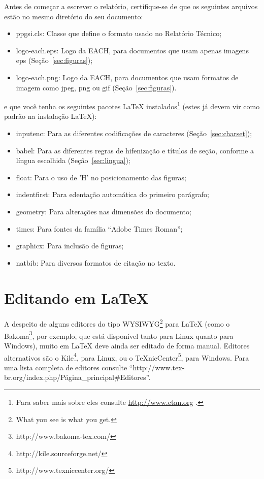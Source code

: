 \documentclass[12pt,a4paper,utf8]{ppgsi}
\begin{document}
	Antes de começar a escrever o relatório, certifique-se de que os seguintes arquivos estão no mesmo diretório do seu documento:

	\begin{itemize}
		\item ppgsi.cls: Classe \LaTeXe{} que define o formato usado no Relatório Técnico;
		\item logo-each.eps: Logo da EACH, para documentos que usam apenas imagens eps (Seção~\ref{sec:figuras});
		\item logo-each.png: Logo da EACH, para documentos que usam formatos de imagem como jpeg, png ou gif (Seção~\ref{sec:figuras}).
	\end{itemize}
	
	\noindent e que você tenha os seguintes pacotes \LaTeX{} instalados\footnote{Para saber mais sobre eles consulte \url{http://www.ctan.org} .} (estes já devem vir como padrão na instalação \LaTeX):
	
	\begin{itemize}
		\item inputenc: Para as diferentes codificações de caracteres (Seção~\ref{sec:charset});
		\item babel: Para as diferentes regras de hifenização e títulos de seção, conforme a língua escolhida (Seção~\ref{sec:lingua});
		\item float: Para o uso de 'H' no posicionamento das figuras;
		\item indentfirst: Para edentação automática do primeiro parágrafo;
		\item geometry: Para alterações nas dimensões do documento;
		\item times: Para fontes da família ``Adobe Times Roman'';
		\item graphicx: Para inclusão de figuras;
		\item natbib: Para diversos formatos de citação no texto.
	\end{itemize}


\section{Editando em \LaTeX}

	A despeito de alguns editores do tipo WYSIWYG\footnote{What you see is what you get.} para \LaTeX{} (como o Bakoma\footnote{http://www.bakoma-tex.com/}, por exemplo, que está disponível tanto para Linux quanto para Windows), muito em \LaTeX{} deve ainda ser editado de forma manual. Editores alternativos são o Kile\footnote{http://kile.sourceforge.net/}, para Linux, ou o TeXnicCenter\footnote{http://www.texniccenter.org/}, para Windows. Para uma lista completa de editores consulte ``http://www.tex-br.org/index.php/Página\_principal\#Editores''.
\end{document}
